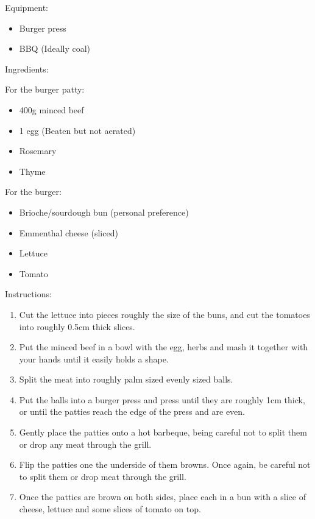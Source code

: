 \documentclass[a4paper, oneside]{book}
\begin{document}
\begin{multicols}{2}
        Equipment:
        {\begin{itemize}
            \item Burger press
            \item BBQ (Ideally coal)
        \end{itemize}}
        Ingredients:

        For the burger patty:
        {\begin{itemize}
            \item 400g minced beef
            \item 1 egg (Beaten but not aerated)
            \item Rosemary
            \item Thyme
        \end{itemize}}
        For the burger:
        {\begin{itemize}
            \item Brioche/sourdough bun (personal preference)
            \item Emmenthal cheese (sliced)
            \item Lettuce
            \item Tomato
        \end{itemize}}
    Instructions:
    {\begin{enumerate}
        \item
            Cut the lettuce into pieces roughly the size of the buns, and cut
            the tomatoes into roughly 0.5cm thick slices.
        \item 
            Put the minced beef in a bowl with the egg, herbs and mash it
            together with your hands until it easily holds a shape.
        \item
            Split the meat into roughly palm sized evenly sized balls.
        \item
            Put the balls into a burger press and press until they are roughly
            1cm thick, or until the patties reach the edge of the press and are
            even.
        \item
            Gently place the patties onto a hot barbeque, being careful not to
            split them or drop any meat through the grill.
        \item
            Flip the patties one the underside of them browns. Once again, be
            careful not to split them or drop meat through the grill.
        \item 
            Once the patties are brown on both sides, place each in a bun with
            a slice of cheese, lettuce and some slices of tomato on top.
    \end{enumerate}}

\end{multicols}
\end{document}

